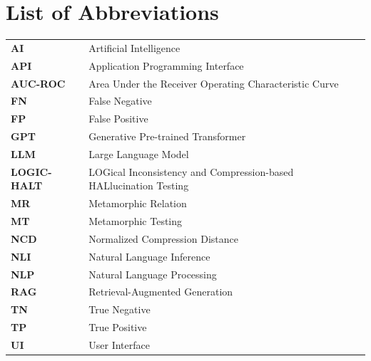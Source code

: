 \chapter*{List of Abbreviations}

\begin{tabular}{ll}
\textbf{AI} & Artificial Intelligence \\
\textbf{API} & Application Programming Interface \\
\textbf{AUC-ROC} & Area Under the Receiver Operating Characteristic Curve \\
\textbf{FN} & False Negative \\
\textbf{FP} & False Positive \\
\textbf{GPT} & Generative Pre-trained Transformer \\
\textbf{LLM} & Large Language Model \\
\textbf{LOGIC-HALT} & LOGical Inconsistency and Compression-based HALlucination Testing \\
\textbf{MR} & Metamorphic Relation \\
\textbf{MT} & Metamorphic Testing \\
\textbf{NCD} & Normalized Compression Distance \\
\textbf{NLI} & Natural Language Inference \\
\textbf{NLP} & Natural Language Processing \\
\textbf{RAG} & Retrieval-Augmented Generation \\
\textbf{TN} & True Negative \\
\textbf{TP} & True Positive \\
\textbf{UI} & User Interface \\
\end{tabular}

\clearpage
